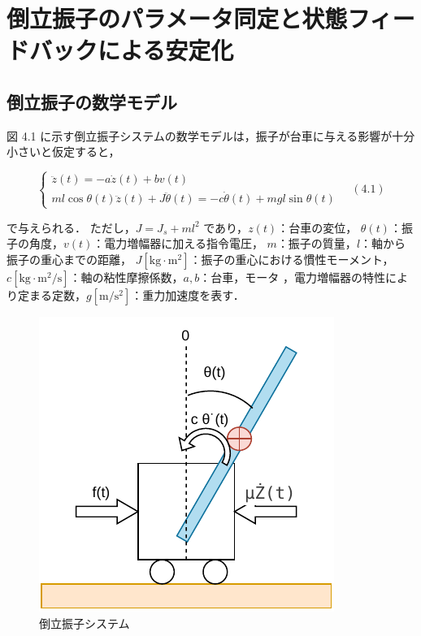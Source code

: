 

\section{倒立振子のパラメータ同定と状態フィードバックによる安定化}

\subsection{倒立振子の数学モデル}

図 4.1 に示す倒立振子システムの数学モデルは，振子が台車に与える影響が十分小さいと仮定すると，

\[
  \begin{cases}
    \ddot{z}(t) = -a\dot{z}(t) + bv(t) \\
    ml \cos\theta(t) \ddot{z}(t) + J\ddot{\theta}(t) = -c\dot{\theta}(t) + mgl \sin\theta(t)
  \end{cases}
  \quad (4.1)
\]

で与えられる．
ただし，\( J = J_s + ml^2 \) であり，\( z(t) \)：台車の変位，
\( \theta(t) \)：振子の角度，\( v(t) \)：電力増幅器に加える指令電圧，
\( m \)：振子の質量，\( l \)：軸から振子の重心までの距離，
\( J [\mathrm{kg\cdot m^2}] \)：振子の重心における慣性モーメント，
\( c [\mathrm{kg\cdot m^2/s}] \)：軸の粘性摩擦係数，\( a, b \)：台車，モータ
，電力増幅器の特性により定まる定数，\( g [\mathrm{m/s^2}] \)：重力加速度を表す．


\begin{figure}[h]
  \centering
  \includegraphics[scale=1]{sozai/1.pdf}
  \caption{ 倒立振子システム}
\end{figure}


